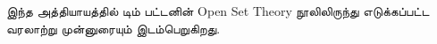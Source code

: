 \documentclass[../../../include/open-logic-chapter]{subfiles}
\begin{document}

\begin{editorial}
இந்த அத்தியாயத்தில் டிம் பட்டனின் Open Set Theory நூலிலிருந்து
எடுக்கப்பட்ட வரலாற்று முன்னுரையும் இடம்பெறுகிறது.
\end{editorial}

\end{document}
